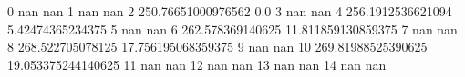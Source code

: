 0 nan nan
1 nan nan
2 250.76651000976562 0.0
3 nan nan
4 256.1912536621094 5.42474365234375
5 nan nan
6 262.578369140625 11.811859130859375
7 nan nan
8 268.522705078125 17.756195068359375
9 nan nan
10 269.81988525390625 19.053375244140625
11 nan nan
12 nan nan
13 nan nan
14 nan nan
